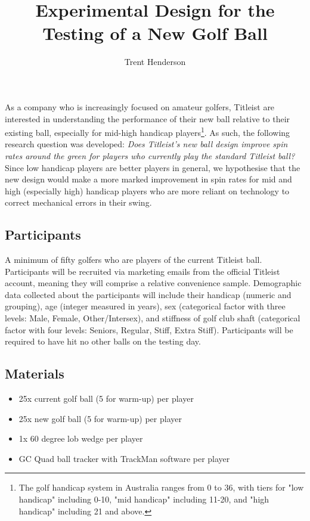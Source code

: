 \documentclass{article}
\begin{document}
\title{\vspace{-4cm}Experimental Design for the Testing of a New Golf Ball}
\author{Trent Henderson}
\date{}

\maketitle

As a company who is increasingly focused on amateur golfers, Titleist are interested in understanding the performance of their new ball relative to their existing ball, especially for mid-high handicap players\footnote{The golf handicap system in Australia ranges from 0 to 36, with tiers for "low handicap" including 0-10, "mid handicap" including 11-20, and "high handicap" including 21 and above.}. 
As such, the following research question was developed: \textit{Does Titleist's new ball design improve spin rates around the green for players who currently play the standard Titleist ball?} 
Since low handicap players are better players in general, we hypothesise that the new design would make a more marked improvement in spin rates for mid and high (especially high) handicap players who are more reliant on technology to correct mechanical errors in their swing.

\subsection*{Participants}

A minimum of fifty golfers who are players of the current Titleist ball. 
Participants will be recruited via marketing emails from the official Titleist account, meaning they will comprise a relative convenience sample. 
Demographic data collected about the participants will include their handicap (numeric and grouping), age (integer measured in years), sex (categorical factor with three levels: Male, Female, Other/Intersex), and stiffness of golf club shaft (categorical factor with four levels: Seniors, Regular, Stiff, Extra Stiff). 
Participants will be required to have hit no other balls on the testing day.

\subsection*{Materials}

\begin{itemize}
    \item 25x current golf ball (5 for warm-up) per player
    \item 25x new golf ball (5 for warm-up) per player
    \item 1x 60 degree lob wedge per player
    \item GC Quad ball tracker with TrackMan software per player
\end{itemize}
\end{document}
